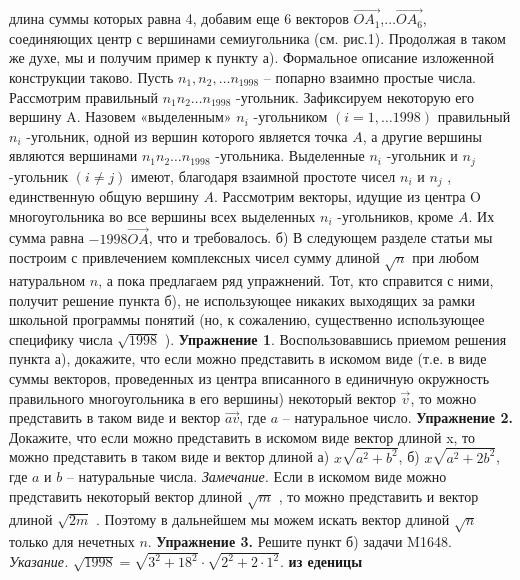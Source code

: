 \documentclass[9pt]{article}
\begin{document}
\begin{multicols}{2}
длина
суммы которых равна 4, добавим еще 6 векторов $\vec{OA_1}$,$\ldots \vec{OA_6}$, соединяющих
центр с вершинами семиугольника (см. рис.1).
Продолжая в таком же
духе, мы и получим пример к пункту а).
Формальное описание
изложенной конструкции
таково. Пусть $n_1, n_2 ,\ldots n_{1998}$ – попарно взаимно простые числа. Рассмотрим правильный $n_1 n_2 \ldots n_{1998}$ -угольник. Зафиксируем некоторую его вершину
A. Назовем «выделенным» $n_i$
-угольником $(i = 1,\ldots 1998)$ правильный $n_i$
-угольник, одной из вершин
которого является точка $A$, а другие вершины являются
вершинами $n_1 n_2 \ldots n_{1998}$ -угольника. Выделенные $n_i$
-угольник и $n_j$
-угольник $(i \neq j)$ имеют, благодаря взаимной
простоте чисел $n_i$
 и $n_j$
, единственную общую вершину $A$.
Рассмотрим векторы, идущие из центра O многоугольника во все вершины всех выделенных $n_i$
-угольников, кроме $A$. Их сумма равна $-1998\vec{OA}$, что и требовалось.
б) В следующем разделе статьи мы построим с привлечением комплексных чисел сумму длиной $\sqrt{n}$ при любом
натуральном $n$, а пока предлагаем ряд упражнений. Тот,
кто справится с ними, получит решение пункта б), не
использующее никаких выходящих за рамки школьной
программы понятий (но, к сожалению, существенно
использующее специфику числа $\sqrt{1998}$ ). \newline
\textbf{Упражнение 1}. Воспользовавшись приемом решения пункта
а), докажите, что если можно представить в искомом виде (т.е.
в виде суммы векторов, проведенных из центра вписанного в
единичную окружность правильного многоугольника в его вершины) некоторый вектор $\vec{v}$, то можно представить в таком виде
и вектор $\vec{av}$, где $a$ – натуральное число. \newline
\textbf{Упражнение 2.} Докажите, что если можно представить в
искомом виде вектор длиной x, то можно представить в таком
виде и вектор длиной а) $x\sqrt{a^2 + b^2}$, б) $x\sqrt{a^2 + 2b^2}$, 
где $a$ и $b$ – натуральные числа.
\emph{Замечание.} Если в искомом виде можно представить некоторый вектор длиной $\sqrt{m}$ , то можно представить и вектор длиной $\sqrt{2m}$ . Поэтому в дальнейшем мы можем искать вектор длиной $\sqrt{n}$ только для нечетных $n$. \newline
\textbf{Упражнение 3.} Решите пункт б) задачи M1648. \newline
\emph{Указание.} $\sqrt{1998}=\sqrt{3^2 + 18^2} \cdot \sqrt{2^2 + 2 \cdot 1^2}$.
\newline
\newline
{\textbf{\large{ из еденицы}}}


\end{multicols}
\end{document}
